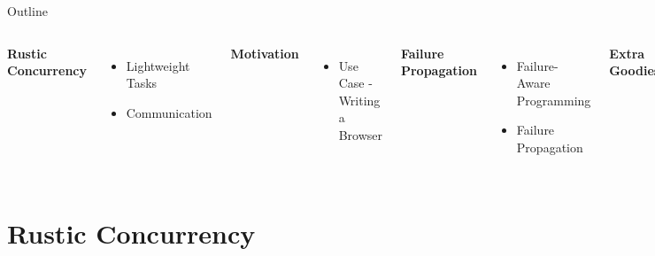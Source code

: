 \documentclass[xcolor=dvipsnames]{beamer}
\begin{document}
\begin{frame}{Outline}
	\begin{columns}[l]
	\textbf{Rustic Concurrency}
	\begin{itemize}
		\item Lightweight Tasks
		\item Communication
	\end{itemize}
	\linegap

	{\bf Motivation}
	\begin{itemize}
		\item Use Case - Writing a Browser
	\end{itemize}
	\linegap

	{\bf Failure Propagation}
	\begin{itemize}
		\item Failure-Aware Programming
		\item Failure Propagation
	\end{itemize}
	\linegap
	{\bf Extra Goodies}
	\begin{center}
	\includegraphics[width=0.9\textwidth]{rust.png}
	\end{center}
	\end{columns}
\end{frame}

\section{Rustic Concurrency}
\end{document}
